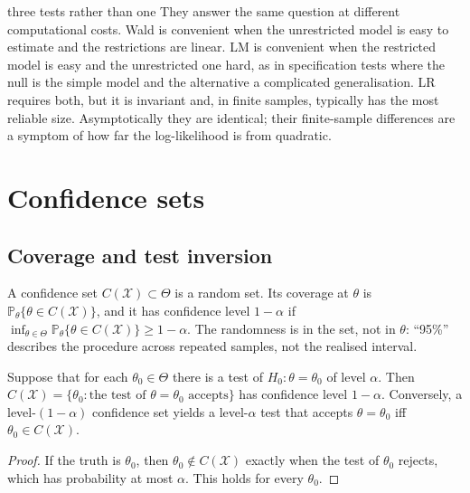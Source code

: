 \documentclass[11pt,a4paper]{article}
\renewcommand{\P}{\mathbb{P}}
\begin{document}
\begin{whybox}{three tests rather than one}
They answer the same question at different computational costs. Wald is convenient when the unrestricted model is easy to estimate and the restrictions are linear. LM is convenient when the restricted model is easy and the unrestricted one hard, as in specification tests where the null is the simple model and the alternative a complicated generalisation. LR requires both, but it is invariant and, in finite samples, typically has the most reliable size. Asymptotically they are identical; their finite-sample differences are a symptom of how far the log-likelihood is from quadratic.
\end{whybox}

\section{Confidence sets}\label{sec:ci}

\subsection{Coverage and test inversion}

A confidence set $C(\mathcal X)\subset\Theta$ is a random set. Its coverage at $\theta$ is $\P_\theta\{\theta\in C(\mathcal X)\}$, and it has confidence level $1-\alpha$ if $\inf_{\theta\in\Theta}\P_\theta\{\theta\in C(\mathcal X)\}\ge1-\alpha$. The randomness is in the set, not in $\theta$: ``95\%'' describes the procedure across repeated samples, not the realised interval.

\begin{theorem}\label{thm:inversion}
Suppose that for each $\theta_0\in\Theta$ there is a test of $H_0:\theta=\theta_0$ of level $\alpha$. Then $C(\mathcal X)=\{\theta_0:\text{the test of }\theta=\theta_0\text{ accepts}\}$ has confidence level $1-\alpha$. Conversely, a level-$(1-\alpha)$ confidence set yields a level-$\alpha$ test that accepts $\theta=\theta_0$ iff $\theta_0\in C(\mathcal X)$.
\end{theorem}

\begin{proof}
If the truth is $\theta_0$, then $\theta_0\notin C(\mathcal X)$ exactly when the test of $\theta_0$ rejects, which has probability at most $\alpha$. This holds for every $\theta_0$.
\end{proof}
\end{document}

